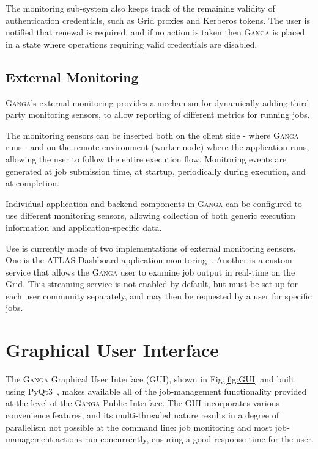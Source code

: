 \documentclass{elsart}
\def\atlas {ATLAS\xspace}
\def\ganga {\textsc{Ganga}\xspace}
\def\grid {Grid\xspace}
\begin{document}
The monitoring sub-system also keeps track of the remaining validity of
authentication credentials, such as \grid proxies and Kerberos tokens.
The user is notified that renewal is required, and if no action is
taken then \ganga is placed in a state where operations requiring
valid credentials are disabled.

\subsection{External Monitoring}
\label{sec:ExternalMonitoring}
\ganga's external monitoring provides a mechanism for dynamically adding third-party
monitoring sensors, to allow reporting of different metrics for running jobs.

The monitoring sensors can be inserted both on the client side - where \ganga
runs - and on the remote environment (worker node) where the application
runs, allowing the user to follow the entire execution flow.  Monitoring
events are generated at job submission time, at startup, periodically
during execution, and at completion.

Individual application and backend components in \ganga can be configured to use
different monitoring sensors, allowing collection of both generic execution
information and application-specific data.

Use is currently made of two implementations of external monitoring sensors. One
is the \atlas Dashboard application monitoring~\cite{andreeva_2008}.
Another is a custom service that allows the \ganga user to examine job output
in real-time on the \grid.  This streaming service
is not enabled by default, but must be set up for each user community separately,
and may then be requested by a user for specific jobs.

\section{Graphical User Interface}
\label{sec:GUI}

The \ganga Graphical User Interface (GUI), shown in  Fig.\ref{fig:GUI} and
built using PyQt3~\cite{rempt_2001}, makes available all of the job-management
functionality provided at the level of the \ganga Public Interface.  The
GUI incorporates various convenience features, and its multi-threaded nature
results in a degree of parallelism not possible at the command line:
job monitoring and most job-management actions run concurrently, ensuring
a good response time for the user.
\end{document}
